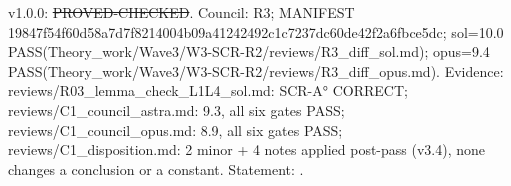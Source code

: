 \begin{theorem}\label{reg:W3-SCR_SCR-Ao}
\end{theorem}
\begin{statusbox}
 v1.0.0: \st{PROVED-CHECKED}. Council: R3; MANIFEST 19847f54f60d58a7d7f8214004b09a41242492c1c7237dc60de42f2a6fbce5dc; sol=10.0 PASS(Theory\_work/Wave3/W3-SCR-R2/reviews/R3\_diff\_sol.md); opus=9.4 PASS(Theory\_work/Wave3/W3-SCR-R2/reviews/R3\_diff\_opus.md). Evidence: reviews/R03\_lemma\_check\_L1L4\_sol.md: SCR-A° CORRECT; reviews/C1\_council\_astra.md: 9.3, all six gates PASS; reviews/C1\_council\_opus.md: 8.9, all six gates PASS; reviews/C1\_disposition.md: 2 minor + 4 notes applied post-pass (v3.4), none changes a conclusion or a constant. Statement: .
\end{statusbox}
